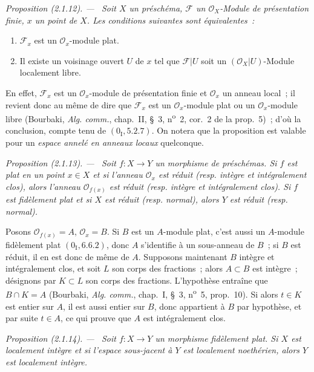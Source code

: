 \documentclass[10pt,oneside]{book}
\newcommand{\oldpage}[2][]{%
  \setcounter{footnote}{0}%
  \marginpar{\scriptsize\textbf{#1}~|~#2}\ignorespaces}
\newenvironment{proposition}[1][]{%
  \par\medskip\noindent\itshape Proposition (#1). ---\ }{\par}
\begin{document}
\begin{proposition}[2.1.12]
\label{IV.2.1.12-fr}
Soit $X$ un préschéma, $\mathscr F$ un $\mathcal O_X$-Module de présentation
finie, $x$ un point de $X$. Les conditions suivantes sont équivalentes~:
\begin{enumerate}
\item[\emph{a)}] $\mathscr F_x$ est un $\mathcal O_x$-module plat.
\item[\emph{b)}] Il existe un voisinage ouvert $U$ de $x$ tel que
$\mathscr F|U$ soit un $(\mathcal O_X|U)$-Module localement libre.
\end{enumerate}
\end{proposition}

En effet, $\mathscr F_x$ est un $\mathcal O_x$-module de présentation finie
et $\mathcal O_x$ un anneau local~; il revient donc au même de dire que
$\mathscr F_x$ est un $\mathcal O_x$-module plat ou un $\mathcal O_x$-module
libre (Bourbaki, \emph{Alg. comm.}, chap.~II, \S~3,
n\textsuperscript{o}~2, cor.~2 de la prop.~5)~; d'où la conclusion, compte
tenu de $(0_{\mathrm I},5.2.7)$. On notera que la proposition est valable pour
un \emph{espace annelé en anneaux locaux} quelconque.

\begin{proposition}[2.1.13]
\label{IV.2.1.13-fr}
Soit $f:X\to Y$ un morphisme de préschémas. Si $f$ est plat en un point
$x\in X$ et si l'anneau $\mathcal O_x$ est réduit (resp. intègre et
intégralement clos), alors l'anneau $\mathcal O_{f(x)}$
\oldpage[IV-2]{9}
est réduit (resp. intègre et intégralement clos). Si $f$ est fidèlement plat
et si $X$ est réduit (resp. normal), alors $Y$ est réduit (resp. normal).
\end{proposition}

Posons $\mathcal O_{f(x)}=A$, $\mathcal O_x=B$. Si $B$ est un $A$-module
plat, c'est aussi un $A$-module fidèlement plat $(0_{\mathrm I},6.6.2)$, donc
$A$ s'identifie à un sous-anneau de $B$~; si $B$ est réduit, il en est donc de
même de $A$. Supposons maintenant $B$ intègre et intégralement clos, et soit
$L$ son corps des fractions~; alors $A\subset B$ est intègre~; désignons par
$K\subset L$ son corps des fractions. L'hypothèse entraîne que
$B\cap K=A$ (Bourbaki, \emph{Alg. comm.}, chap.~I, \S~3,
n\textsuperscript{o}~5, prop.~10). Si alors $t\in K$ est entier sur $A$, il
est aussi entier sur $B$, donc appartient à $B$ par hypothèse, et par suite
$t\in A$, ce qui prouve que $A$ est intégralement clos.

\begin{proposition}[2.1.14]
\label{IV.2.1.14-fr}
Soit $f:X\to Y$ un morphisme fidèlement plat. Si $X$ est localement intègre
et si l'espace sous-jacent à $Y$ est localement noethérien, alors $Y$ est
localement intègre.
\end{proposition}
\end{document}
